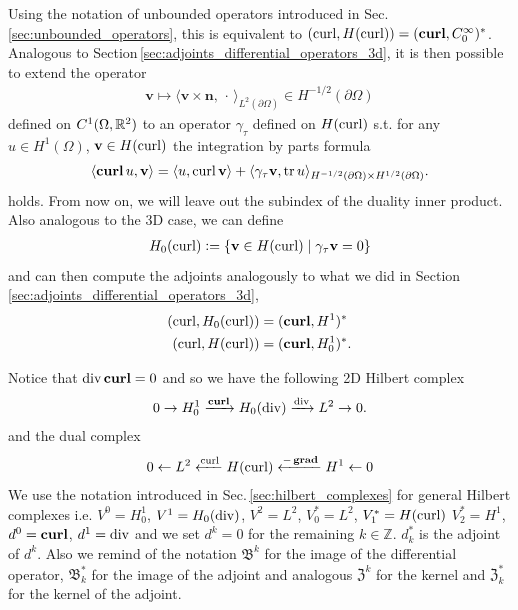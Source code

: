 \documentclass[../master_thesis.tex]{subfiles}
\begin{document}
Using the notation of unbounded operators introduced in Sec.\,\ref{sec:unbounded_operators}, 
this is equivalent to
$(\curl, H(\curl)) = (\veccurl, C_0^\infty)^*$. 
Analogous to Section\,\ref{sec:adjoints_differential_operators_3d}, it is then possible to extend the 
operator
\begin{align}
    \mathbf{v} \mapsto \langle \mathbf{v} \times \mathbf{n} , \,\cdot \, \rangle_{L^2(\partial \Omega)}
    \in H^{-1/2}(\partial \Omega)
\end{align}
defined on $C^1(\Omega, \real^2)$
to an operator $\gamma_\tau$ defined on $H(\curl)$ s.t. 
for any $u\in H^1(\Omega)$, $\mathbf{v} \in H(\curl)$
the integration by parts formula
\begin{align*}
    \langle \veccurl u, \mathbf{v} \rangle = \langle  u, \curl \mathbf{v} \rangle 
        + \langle \gamma_\tau \mathbf{v} , \tr u \rangle_{H^{-1/2}(\partial \Omega)\times H^{1/2}(\partial \Omega)}.
\end{align*}
holds. From now on, we will leave out the subindex of the duality inner product. Also analogous to the 3D case,
we can define 
\begin{align*}
    H_0(\curl) \vcentcolon= \{ \mathbf{v} \in H(\curl) \mid \gamma_\tau \mathbf{v} = 0\}
\end{align*}
and can then compute the adjoints analogously to what we did in Section\,\ref{sec:adjoints_differential_operators_3d},
\begin{align*}
    (\curl, H_0(\curl)) & = (\veccurl, H^1)^* 
    \\ (\curl, H(\curl)) & = (\veccurl, H_0^1)^*.
\end{align*}

Notice that $\diver \veccurl = 0$ and so 
we have the following 2D Hilbert complex 
\begin{align}
    0 \rightarrow H^1_0 \xrightarrow{\veccurl} H_0(\diver) 
    \xrightarrow{\diver} L^2 \rightarrow 0. \label{eq:2D_hilbert_complex}
\end{align}
and the dual complex
\begin{align*}
    0 \leftarrow L^2 \xleftarrow{\curl} H(\curl) \xleftarrow{-\bm{\grad}} H^1 \leftarrow 0
\end{align*}
We use the notation introduced in Sec.\,\ref{sec:hilbert_complexes} for general Hilbert complexes i.e.
$V^0 = H^1_0$, $V^1= H_0(\diver)$, $V^2= L^2$, $V^*_0 = L^2$, $V^*_1 = H(\curl)$ $V^*_2 = H^1$, 
$d^0 = \veccurl$, $d^1 = \diver$ and we set $d^k=0$ for the remaining $k \in \mathbb{Z}$. 
$d^*_k$ is the adjoint of $d^k$.
Also we remind of 
the notation $\mathfrak{B}^k$ for the image of the differential operator, $\mathfrak{B}^*_k$ 
for the image of the adjoint and analogous $\mathfrak{Z}^k$ for the kernel and 
$\mathfrak{Z}_k^*$ for the kernel of the adjoint.
\end{document}
